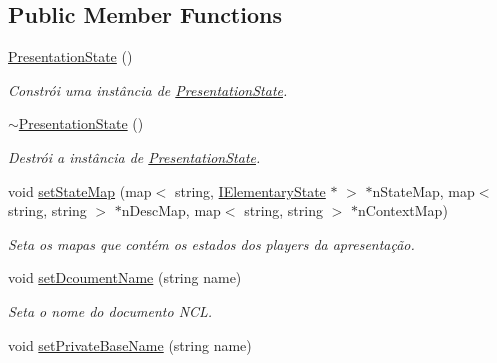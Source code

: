 \subsection*{Public Member Functions}
\begin{DoxyCompactItemize}
\item 
\hyperlink{classbr_1_1ufscar_1_1lince_1_1ginga_1_1wac_1_1state_1_1PresentationState_aa48f61ac6a0cf382182bd6fb4f548b87}{PresentationState} ()
\begin{DoxyCompactList}\small\item\em Constrói uma instância de \hyperlink{classbr_1_1ufscar_1_1lince_1_1ginga_1_1wac_1_1state_1_1PresentationState}{PresentationState}. \item\end{DoxyCompactList}\item 
\hyperlink{classbr_1_1ufscar_1_1lince_1_1ginga_1_1wac_1_1state_1_1PresentationState_a324581a9a822f53cf7365321ae35f2ec}{$\sim$PresentationState} ()
\begin{DoxyCompactList}\small\item\em Destrói a instância de \hyperlink{classbr_1_1ufscar_1_1lince_1_1ginga_1_1wac_1_1state_1_1PresentationState}{PresentationState}. \item\end{DoxyCompactList}\item 
void \hyperlink{classbr_1_1ufscar_1_1lince_1_1ginga_1_1wac_1_1state_1_1PresentationState_a02bf97b60acc4e5ba168961d8e695195}{setStateMap} (map$<$ string, \hyperlink{classbr_1_1ufscar_1_1lince_1_1ginga_1_1wac_1_1state_1_1IElementaryState}{IElementaryState} $\ast$ $>$ $\ast$nStateMap, map$<$ string, string $>$ $\ast$nDescMap, map$<$ string, string $>$ $\ast$nContextMap)
\begin{DoxyCompactList}\small\item\em Seta os mapas que contém os estados dos players da apresentação. \item\end{DoxyCompactList}\item 
void \hyperlink{classbr_1_1ufscar_1_1lince_1_1ginga_1_1wac_1_1state_1_1PresentationState_aadc7632e1bff7b0c2680a5193679e1d9}{setDcoumentName} (string name)
\begin{DoxyCompactList}\small\item\em Seta o nome do documento NCL. \item\end{DoxyCompactList}\item 
void \hyperlink{classbr_1_1ufscar_1_1lince_1_1ginga_1_1wac_1_1state_1_1PresentationState_a127842284622579c23ec1d6ce974fe8f}{setPrivateBaseName} (string name)

\end{DoxyCompactItemize}
